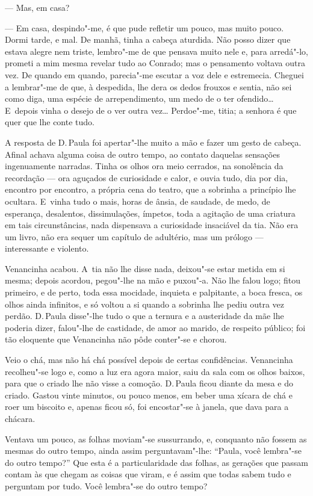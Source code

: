 \begin{linenumbers}
--- Mas, em casa?

--- Em casa, despindo"-me, é que pude refletir um pouco, mas muito pouco.
Dormi tarde, e mal. De manhã, tinha a cabeça aturdida. Não posso dizer
que estava alegre nem triste, lembro"-me de que pensava muito nele e,
para arredá"-lo, prometi a mim mesma revelar tudo ao Conrado; mas o
pensamento voltava outra vez. De quando em quando, parecia"-me escutar a
voz dele e estremecia. Cheguei a lembrar"-me de que, à despedida, lhe
dera os dedos frouxos e sentia, não sei como diga, uma espécie de
arrependimento, um medo de o ter ofendido\ldots{} E~depois vinha o desejo de
o ver outra vez\ldots{} Perdoe"-me, titia; a senhora é que quer que lhe conte
tudo.

A resposta de D.\,Paula foi apertar"-lhe muito a mão e fazer um gesto de
cabeça. Afinal achava alguma coisa de outro tempo, ao contato daquelas
sensações ingenuamente narradas. Tinha os olhos ora meio cerrados, na
sonolência da recordação --- ora aguçados de curiosidade e calor, e ouvia
tudo, dia por dia, encontro por encontro, a própria cena do teatro, que
a sobrinha a princípio lhe ocultara. E~vinha tudo o mais, horas de
ânsia, de saudade, de medo, de esperança, desalentos, dissimulações,
ímpetos, toda a agitação de uma criatura em tais circunstâncias, nada
dispensava a curiosidade insaciável da tia. Não era um livro, não era
sequer um capítulo de adultério, mas um prólogo --- interessante e
violento.

Venancinha acabou. A~tia não lhe disse nada, deixou"-se estar metida em
si mesma; depois acordou, pegou"-lhe na mão e puxou"-a. Não lhe falou
logo; fitou primeiro, e de perto, toda essa mocidade, inquieta e
palpitante, a boca fresca, os olhos ainda infinitos, e só voltou a si
quando a sobrinha lhe pediu outra vez perdão. D.\,Paula disse"-lhe tudo o
que a ternura e a austeridade da mãe lhe poderia dizer, falou"-lhe de
castidade, de amor ao marido, de respeito público; foi tão eloquente que
Venancinha não pôde conter"-se e chorou.

Veio o chá, mas não há chá possível depois de certas confidências.
Venancinha recolheu"-se logo e, como a luz era agora maior, saiu da sala
com os olhos baixos, para que o criado lhe não visse a comoção. D.\,Paula
ficou diante da mesa e do criado. Gastou vinte minutos, ou pouco menos,
em beber uma xícara de chá e roer um biscoito e, apenas ficou só, foi
encostar"-se à janela, que dava para a chácara.

Ventava um pouco, as folhas moviam"-se sussurrando, e, conquanto não
fossem as mesmas do outro tempo, ainda assim perguntavam"-lhe: ``Paula,
você lembra"-se do outro tempo?'' Que esta é a particularidade das
folhas, as gerações que passam contam às que chegam as coisas que viram,
e é assim que todas sabem tudo e perguntam por tudo. Você lembra"-se do
outro tempo?


\end{linenumbers}
